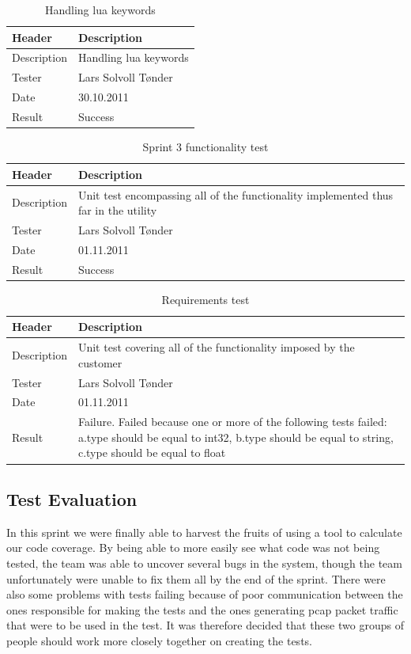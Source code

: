 \begin{table}[!htb] \footnotesize \center
\caption{Handling \Gls{lua} keywords \label{tab:sp3TID23}}
\begin{tabular}{l l}
	\toprule
	Header & Description \\
	\midrule
	Description & Handling \Gls{lua} keywords \\
	Tester & Lars Solvoll Tønder\\
	Date & 30.10.2011\\
	Result & Success\\
	\bottomrule
\end{tabular}
\end{table}

\begin{table}[!htb] \footnotesize \center
\caption{Sprint 3 functionality test \label{tab:sp3TID24}}
\begin{tabular}{l l}
	\toprule
	Header & Description \\
	\midrule
	Description & Unit test encompassing all of the functionality implemented thus far in the \gls{utility} \\
	Tester & Lars Solvoll Tønder\\
	Date & 01.11.2011\\
	Result & Success\\
	\bottomrule
\end{tabular}
\end{table}

\begin{table}[!htb] \footnotesize \center
\caption{Requirements test \label{tab:sp3TID25}}
\begin{tabular}{l l}
	\toprule
	Header & Description \\
	\midrule
	Description & Unit test covering all of the functionality imposed by the customer \\
	Tester & Lars Solvoll Tønder\\
	Date & 01.11.2011\\
	Result & Failure. Failed because one or more of the following tests failed: a.type should be equal to int32, b.type should be equal to \gls{string}, c.type should be equal to \gls{float}\\
	\bottomrule
\end{tabular}
\end{table}

\subsection{Test Evaluation}
In this sprint we were finally able to harvest the fruits of using a tool to calculate our code coverage. By being able to more easily see what code was not being tested, the team was able to uncover several bugs in the system, though the team unfortunately were unable to fix them all by the end of the sprint. There were also some problems with tests failing because of poor communication between the ones responsible for making the tests and the ones generating pcap \gls{packet} traffic that were to be used in the test. It was therefore decided that these two groups of people should work more closely together on creating the tests.



